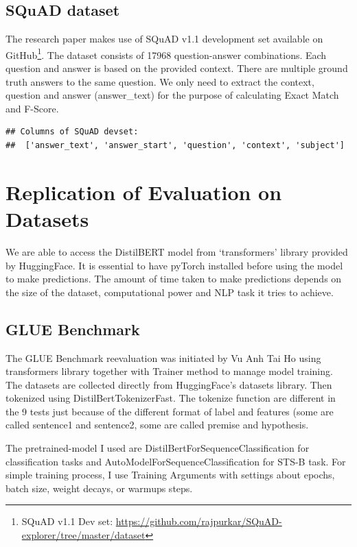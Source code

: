 \documentclass[
  11pt,
]{article}
\begin{document}
\subsection{SQuAD dataset}\label{squad-dataset}

The research paper makes use of SQuAD v1.1 development set available on
GitHub\footnote{SQuAD v1.1 Dev set:
  \url{https://github.com/rajpurkar/SQuAD-explorer/tree/master/dataset}}.
The dataset consists of 17968 question-answer combinations. Each
question and answer is based on the provided context. There are multiple
ground truth answers to the same question. We only need to extract the
context, question and answer (answer\_text) for the purpose of
calculating Exact Match and F-Score.

\begin{verbatim}
## Columns of SQuAD devset:
##  ['answer_text', 'answer_start', 'question', 'context', 'subject']
\end{verbatim}

\section{Replication of Evaluation on
Datasets}\label{replication-of-evaluation-on-datasets}

We are able to access the DistilBERT model from `transformers' library
provided by HuggingFace. It is essential to have pyTorch installed
before using the model to make predictions. The amount of time taken to
make predictions depends on the size of the dataset, computational power
and NLP task it tries to achieve.

\subsection{GLUE Benchmark}\label{glue-benchmark-1}

The GLUE Benchmark reevaluation was initiated by Vu Anh Tai Ho using
transformers library together with Trainer method to manage model
training. The datasets are collected directly from HuggingFace's
datasets library. Then tokenized using DistilBertTokenizerFast. The
tokenize function are different in the 9 tests just because of the
different format of label and features (some are called sentence1 and
sentence2, some are called premise and hypothesis.

The pretrained-model I used are DistilBertForSequenceClassification for
classification tasks and AutoModelForSequenceClassification for STS-B
task. For simple training process, I use Training Arguments with
settings about epochs, batch size, weight decays, or warmups steps.
\end{document}

